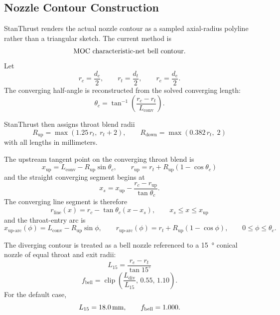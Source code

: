 \documentclass[11pt]{article}
\newcommand{\clip}{\operatorname{clip}}
\begin{document}
\subsection{Nozzle Contour Construction}
StanThrust renders the actual nozzle contour as a sampled axial-radius polyline rather than a triangular sketch. The current method is
\[
\text{MOC characteristic-net bell contour}.
\]
Let
\[
r_c=\frac{d_c}{2},\qquad r_t=\frac{d_t}{2},\qquad r_e=\frac{d_e}{2}.
\]
The converging half-angle is reconstructed from the solved converging length:
\begin{equation}
\theta_c=\tan^{-1}\!\left(\frac{r_c-r_t}{L_{\text{conv}}}\right).
\label{eq:converging-half-angle}
\end{equation}

StanThrust then assigns throat blend radii
\begin{equation}
R_{\text{up}}=\max(1.25\,r_t,\;r_t+2),
\qquad
R_{\text{down}}=\max(0.382\,r_t,\;2)
\label{eq:throat-blend-radii}
\end{equation}
with all lengths in millimeters.

The upstream tangent point on the converging throat blend is
\begin{equation}
x_{\text{up}}=L_{\text{conv}}-R_{\text{up}}\sin\theta_c,
\qquad
r_{\text{up}}=r_t+R_{\text{up}}\left(1-\cos\theta_c\right)
\label{eq:upstream-tangent}
\end{equation}
and the straight converging segment begins at
\begin{equation}
x_s=x_{\text{up}}-\frac{r_c-r_{\text{up}}}{\tan\theta_c}.
\label{eq:straight-converging-start}
\end{equation}
The converging line segment is therefore
\begin{equation}
r_{\text{line}}(x)=r_c-\tan\theta_c\left(x-x_s\right),
\qquad x_s\le x\le x_{\text{up}}
\label{eq:converging-line}
\end{equation}
and the throat-entry arc is
\begin{equation}
x_{\text{up-arc}}(\phi)=L_{\text{conv}}-R_{\text{up}}\sin\phi,
\qquad
r_{\text{up-arc}}(\phi)=r_t+R_{\text{up}}\left(1-\cos\phi\right),
\qquad 0\le \phi\le \theta_c.
\label{eq:converging-arc}
\end{equation}

The diverging contour is treated as a bell nozzle referenced to a \SI{15}{\degree} conical nozzle of equal throat and exit radii:
\begin{equation}
L_{15}=\frac{r_e-r_t}{\tan 15^\circ}
\label{eq:l15}
\end{equation}
\begin{equation}
f_{\text{bell}}=\clip\!\left(\frac{L_{\text{div}}}{L_{15}},\,0.55,\,1.10\right).
\label{eq:bell-length-fraction}
\end{equation}
For the default case,
\[
L_{15}=\SI{18.0}{mm},
\qquad
f_{\text{bell}}=1.000.
\]
\end{document}
